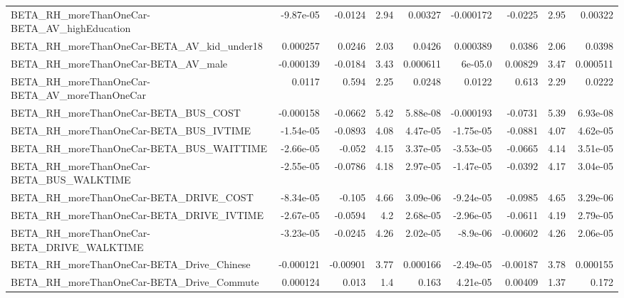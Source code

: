 \begin{tabular}{lrrrrrrrr}
BETA\_RH\_moreThanOneCar-BETA\_AV\_highEducation       &   -9.87e-05 &      -0.0124 &     2.94 &  0.00327 &  -0.000172 &     -0.0225 &         2.95 &       0.00322 \\
BETA\_RH\_moreThanOneCar-BETA\_AV\_kid\_under18         &    0.000257 &       0.0246 &     2.03 &   0.0426 &   0.000389 &      0.0386 &         2.06 &        0.0398 \\
BETA\_RH\_moreThanOneCar-BETA\_AV\_male                &   -0.000139 &      -0.0184 &     3.43 & 0.000611 &    6e-05.0 &     0.00829 &         3.47 &      0.000511 \\
BETA\_RH\_moreThanOneCar-BETA\_AV\_moreThanOneCar      &      0.0117 &        0.594 &     2.25 &   0.0248 &     0.0122 &       0.613 &         2.29 &        0.0222 \\
BETA\_RH\_moreThanOneCar-BETA\_BUS\_COST               &   -0.000158 &      -0.0662 &     5.42 & 5.88e-08 &  -0.000193 &     -0.0731 &         5.39 &      6.93e-08 \\
BETA\_RH\_moreThanOneCar-BETA\_BUS\_IVTIME             &   -1.54e-05 &      -0.0893 &     4.08 & 4.47e-05 &  -1.75e-05 &     -0.0881 &         4.07 &      4.62e-05 \\
BETA\_RH\_moreThanOneCar-BETA\_BUS\_WAITTIME           &   -2.66e-05 &       -0.052 &     4.15 & 3.37e-05 &  -3.53e-05 &     -0.0665 &         4.14 &      3.51e-05 \\
BETA\_RH\_moreThanOneCar-BETA\_BUS\_WALKTIME           &   -2.55e-05 &      -0.0786 &     4.18 & 2.97e-05 &  -1.47e-05 &     -0.0392 &         4.17 &      3.04e-05 \\
BETA\_RH\_moreThanOneCar-BETA\_DRIVE\_COST             &   -8.34e-05 &       -0.105 &     4.66 & 3.09e-06 &  -9.24e-05 &     -0.0985 &         4.65 &      3.29e-06 \\
BETA\_RH\_moreThanOneCar-BETA\_DRIVE\_IVTIME           &   -2.67e-05 &      -0.0594 &      4.2 & 2.68e-05 &  -2.96e-05 &     -0.0611 &         4.19 &      2.79e-05 \\
BETA\_RH\_moreThanOneCar-BETA\_DRIVE\_WALKTIME         &   -3.23e-05 &      -0.0245 &     4.26 & 2.02e-05 &   -8.9e-06 &    -0.00602 &         4.26 &      2.06e-05 \\
BETA\_RH\_moreThanOneCar-BETA\_Drive\_Chinese          &   -0.000121 &     -0.00901 &     3.77 & 0.000166 &  -2.49e-05 &    -0.00187 &         3.78 &      0.000155 \\
BETA\_RH\_moreThanOneCar-BETA\_Drive\_Commute          &    0.000124 &        0.013 &      1.4 &    0.163 &   4.21e-05 &     0.00409 &         1.37 &         0.172 \\

\end{tabular}

